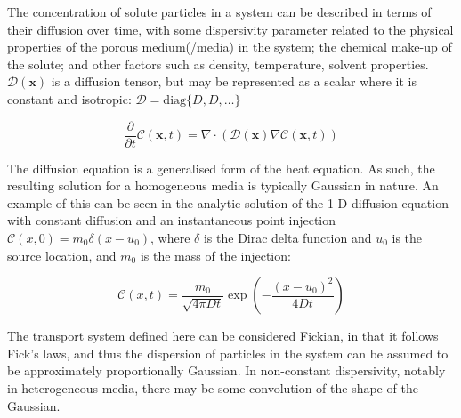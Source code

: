 \documentclass[11pt]{article}
\begin{document}
The concentration of solute particles in a system can be described in
terms of their diffusion over time, with some dispersivity parameter
related to the physical properties of the porous medium(/media) in the
system; the chemical make-up of the solute; and other factors such as
density, temperature, solvent properties. \(\mathcal{D}(\mathbf{x})\) is
a diffusion tensor, but may be represented as a scalar where it is
constant and isotropic: \(\mathcal{D} = \mathrm{diag}\{D, D, \ldots\}\)

\[
    \frac{\partial}{\partial t}\mathcal{C}(\mathbf{x},t) = \nabla\cdot\left(\mathcal{D}(\mathbf{x})\nabla \mathcal{C}(\mathbf{x},t)\right)
\]

The diffusion equation is a generalised form of the heat equation. As
such, the resulting solution for a homogeneous media is typically
Gaussian in nature. An example of this can be seen in the analytic
solution of the 1-D diffusion equation with constant diffusion and an
instantaneous point injection
\(\mathcal{C}(x, 0) = m_0\delta(x - u_0)\), where \(\delta\) is the
Dirac delta function and \(u_0\) is the source location, and \(m_0\) is
the mass of the injection:

\[
    \mathcal{C}(x,t) = \frac{m_0}{\sqrt{4\pi Dt}}\exp\left(-\frac{(x-u_0)^2}{4Dt}\right)
\]

The transport system defined here can be considered Fickian, in that it
follows Fick's laws, and thus the dispersion of particles in the system
can be assumed to be approximately proportionally Gaussian. In
non-constant dispersivity, notably in heterogeneous media, there may be
some convolution of the shape of the Gaussian.
\end{document}
